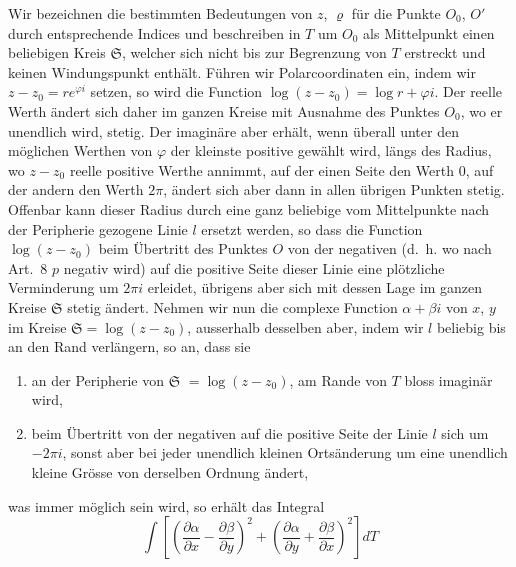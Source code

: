 \documentclass[12pt,a4paper]{book}
\theoremstyle{definition}
\theoremstyle{remark}
\begin{document}
Wir bezeichnen die bestimmten Bedeutungen von $z$, $\varrho$ für die Punkte $O_0$, $O'$ durch entsprechende Indices und beschreiben in $T$ um $O_0$ als Mittelpunkt einen beliebigen Kreis $\mathfrak{S}$, welcher sich nicht bis zur Begrenzung von $T$ erstreckt und keinen Windungspunkt enthält. Führen wir Polarcoordinaten ein, indem wir $z - z_0 = re^{\varphi i}$ setzen, so wird die Function $\log(z - z_0) = \log r + \varphi i$. Der reelle Werth ändert sich daher im ganzen Kreise mit Ausnahme des Punktes $O_0$, wo er unendlich wird, stetig. Der imaginäre aber erhält, wenn überall unter den möglichen Werthen von $\varphi$ der kleinste positive gewählt wird, längs des Radius, wo $z - z_0$ reelle positive Werthe annimmt, auf der einen Seite den Werth $0$, auf der andern den Werth $2\pi$, ändert sich aber dann in allen übrigen Punkten stetig. Offenbar kann dieser Radius durch eine ganz beliebige vom Mittelpunkte nach der Peripherie gezogene Linie $l$ ersetzt werden, so dass die Function $\log(z - z_0)$ beim Übertritt des Punktes $O$ von der negativen (d.~h. wo nach Art.~8 $p$ negativ wird) auf die positive Seite dieser Linie eine plötzliche Verminderung um $2\pi i$ erleidet, übrigens aber sich mit dessen Lage im ganzen Kreise $\mathfrak{S}$ stetig ändert. Nehmen wir nun die complexe Function $\alpha + \beta i$ von $x$, $y$ im Kreise $\mathfrak{S} = \log(z - z_0)$, ausserhalb desselben aber, indem wir $l$ beliebig bis an den Rand verlängern, so an, dass sie
\begin{enumerate}
\item an der Peripherie von $\mathfrak{S}$ $= \log(z - z_0)$, am Rande von $T$ bloss imaginär wird,
\item beim Übertritt von der negativen auf die positive Seite der Linie $l$ sich um $-2\pi i$, sonst aber bei jeder unendlich kleinen Ortsänderung um eine unendlich kleine Grösse von derselben Ordnung ändert,
\end{enumerate}
was immer möglich sein wird, so erhält das Integral
\[
\int \left[\left(\frac{\partial \alpha}{\partial x} - \frac{\partial \beta}{\partial y}\right)^2 + \left(\frac{\partial \alpha}{\partial y} + \frac{\partial \beta}{\partial x}\right)^2\right] dT
\]
\end{document}
